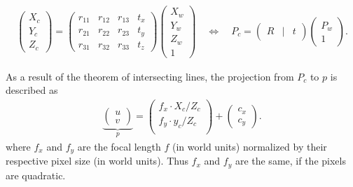 \begin{align}
\begin{pmatrix}
X_c\\
Y_c\\
Z_c
\end{pmatrix}=
\begin{pmatrix}
r_{11}&r_{12}&r_{13}&t_x\\
r_{21}&r_{22}&r_{23}&t_y\\
r_{31}&r_{32}&r_{33}&t_z
\end{pmatrix}
\begin{pmatrix}
X_w\\
Y_w\\
Z_w\\
1
\end{pmatrix}\quad\Leftrightarrow\quad
P_c=
\begin{pmatrix}
R&|&t
\end{pmatrix}
\begin{pmatrix}
P_w\\
1
\end{pmatrix}\label{theory:world-camera}.
\end{align}

As a result of the theorem of intersecting lines, the projection from $P_c$ to $p$ is described as
\begin{align*}
\underbrace{\begin{pmatrix}
u\\
v
\end{pmatrix}}_{p}=
\begin{pmatrix}
f_x\cdot X_c/Z_c\\
f_y\cdot y_c/Z_c\\
\end{pmatrix}+
\begin{pmatrix}
c_x\\
c_y
\end{pmatrix}.
\end{align*}
where $f_x$ and $f_y$ are the focal length $f$ (in world units) normalized by their respective pixel size (in world units). Thus $f_x$ and $f_y$ are the same, if the pixels are quadratic.

